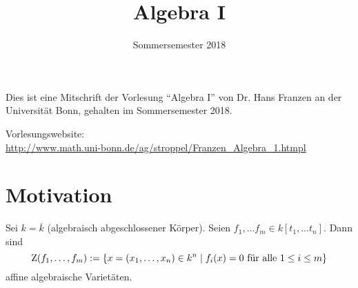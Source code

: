 \documentclass[12pt,a4paper]{scrartcl}
\author{}
\title{Algebra I}
\subtitle{Sommersemester 2018}
\date{\lastcompiled}
\theoremstyle{cplain}
\theoremstyle{cdef}
\begin{document}
\maketitle
\tableofcontents
\newpage

\noindent
Dies ist eine Mitschrift der Vorlesung \enquote{Algebra I} von Dr. Hans Franzen an der Universität Bonn, gehalten im Sommersemester 2018.

\bigskip

\noindent
Vorlesungswebsite:\\
\url{http://www.math.uni-bonn.de/ag/stroppel/Franzen_Algebra_1.htmpl}

\nocite{atiyah-macdonald}
\nocite{eisenbud}
\nocite{matsumura}
\printbibliography[notkeyword=moduln-hir,title=Allgemeine Literatur]

\nocite{lang}
\nocite{hungerford}
\printbibliography[keyword=moduln-hir,title=Literatur zu \cref{sec:moduln ueber hir}]


\newpage


\section{Motivation}
Sei $k=\overline k$ (algebraisch abgeschlossener Körper). Seien $f_1, \dots f_m \in k[t_1,\dots t_n]$. Dann sind \[ \operatorname{Z}(f_1,\dots, f_m) := \{x=(x_1,\dots, x_n) \in k^n \mid f_i(x)=0 \text{ für alle $1\le i \le m$} \}\] affine algebraische Varietäten.
\end{document}
